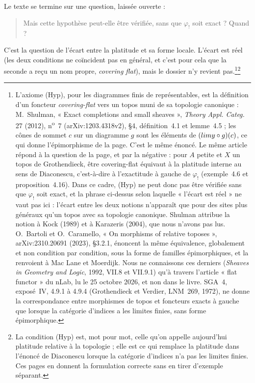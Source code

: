 \documentclass[11pt,a4paper]{article}
\begin{document}
Le texte se termine sur une question, laissée ouverte :

\begin{quote}
Mais cette hypothèse peut-elle être vérifiée, sans que $\varphi_{!}$ soit
exact ? Quand ?
\end{quote}

C'est la question de l'écart entre la platitude et sa forme locale.
L'écart est réel (les deux conditions ne coïncident pas en général, et c'est
pour cela que la seconde a reçu un nom propre, \emph{covering flat}), mais le
dossier n'y revient pas.\footnote{L'axiome (Hyp), pour les diagrammes finis de
représentables, est la définition d'un foncteur \emph{covering-flat} vers un
topos muni de sa topologie canonique : M.~Shulman, « Exact completions and
small sheaves », \emph{Theory Appl. Categ.} 27 (2012), n\textsuperscript{o}~7
(arXiv:1203.4318v2), §4, définition~4.1 et lemme~4.5 ; les cônes de sommet $c$
sur un diagramme $g$ sont les éléments de $(\varprojlim y \circ g)(c)$, ce qui
donne l'épimorphisme de la page. C'est le même énoncé. Le même
article répond à la question de la page, et par la négative : pour $A$ petite
et $X$ un topos de Grothendieck, être covering-flat équivaut à la platitude
interne au sens de Diaconescu, c'est-à-dire à l'exactitude à gauche de
$\varphi_{!}$ (exemple~4.6 et proposition~4.16). Dans ce cadre, (Hyp) ne peut
donc pas être vérifiée sans que $\varphi_{!}$ soit exact, et la phrase
ci-dessus selon laquelle « l'écart est réel » ne vaut pas ici : l'écart entre
les deux notions n'apparaît que pour des sites plus généraux qu'un topos avec
sa topologie canonique. Shulman attribue la notion à Kock (1989) et à Karazeris
(2004), que nous n'avons pas lus. O.~Bartoli et O.~Caramello, « On morphisms of
relative toposes », arXiv:2310.20691 (2023), §3.2.1, énoncent la même
équivalence, globalement et non condition par condition, sous la forme de
familles épimorphiques, et la renvoient à Mac Lane et Moerdijk. Nous ne
connaissons ces derniers (\emph{Sheaves in Geometry and Logic}, 1992, VII.8 et
VII.9.1) qu'à travers l'article « flat functor » du nLab, lu le 25 octobre 2026,
et non dans le livre. SGA~4, exposé~IV, 4.9.1 à 4.9.4 (Grothendieck et
Verdier, LNM~269, 1972), ne donne la correspondance entre morphismes de topos
et foncteurs exacts à gauche que lorsque la catégorie d'indices a les limites
finies, sans forme épimorphique.}\footnote{La condition (Hyp) est, mot pour mot, celle
qu'on appelle aujourd'hui platitude relative à la topologie ; elle est ce qui
remplace la platitude dans l'énoncé de Diaconescu lorsque la catégorie
d'indices n'a pas les limites finies. Ces pages en donnent la formulation
correcte sans en tirer d'exemple séparant.}
\end{document}
